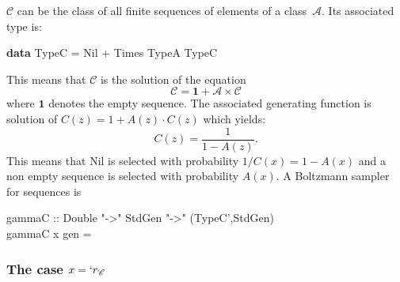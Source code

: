 \documentclass{sig-alternate}
\newcommand{\C}{\mathscr{C}}
\begin{document}
$\C$ can be the class of all finite sequences of elements of a class~$\mathscr{A}$. Its
associated type is:
\begin{haskell}
  \textbf{data} TypeC = Nil + Times TypeA TypeC
\end{haskell}
This means that $\C$ is the solution of the equation $$\C = \mathbf{1} + \mathscr{A}
\times \C$$ where $\mathbf{1}$ denotes the empty sequence.  The associated generating
function is solution of $C(z) = 1 + A(z) \cdot C(z)$ which yields:
\begin{displaymath}
  C(z) = \frac{1}{1-A(z)}.
\end{displaymath}
This means that \<Nil\> is selected with probability $1/C(x) = 1-A(x)$ and a non empty
sequence is selected with probability $A(x)$.  
A Boltzmann sampler for sequences is
\begin{haskell}
  \hspace*{-20pt}gammaC  :: Double "->" StdGen "->" (TypeC',StdGen)\\
  \hspace*{-20pt}gammaC x gen = 
\end{haskell}

\subsubsection*{The case $x=`r_\C$}
\end{document}
